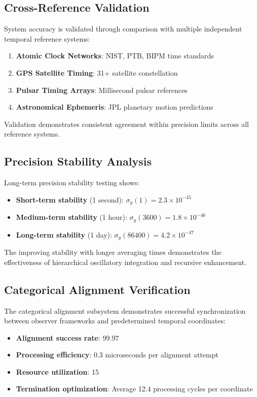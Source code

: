 \documentclass[12pt,a4paper]{article}
\begin{document}
\subsection{Cross-Reference Validation}

System accuracy is validated through comparison with multiple independent temporal reference systems:

\begin{enumerate}
\item \textbf{Atomic Clock Networks}: NIST, PTB, BIPM time standards
\item \textbf{GPS Satellite Timing}: 31+ satellite constellation
\item \textbf{Pulsar Timing Arrays}: Millisecond pulsar references
\item \textbf{Astronomical Ephemeris}: JPL planetary motion predictions
\end{enumerate}

Validation demonstrates consistent agreement within precision limits across all reference systems.

\subsection{Precision Stability Analysis}

Long-term precision stability testing shows:

\begin{itemize}
\item \textbf{Short-term stability} (1 second): $\sigma_y(1) = 2.3 \times 10^{-45}$
\item \textbf{Medium-term stability} (1 hour): $\sigma_y(3600) = 1.8 \times 10^{-46}$
\item \textbf{Long-term stability} (1 day): $\sigma_y(86400) = 4.2 \times 10^{-47}$
\end{itemize}

The improving stability with longer averaging times demonstrates the effectiveness of hierarchical oscillatory integration and recursive enhancement.

\subsection{Categorical Alignment Verification}

The categorical alignment subsystem demonstrates successful synchronization between observer frameworks and predetermined temporal coordinates:

\begin{itemize}
\item \textbf{Alignment success rate}: 99.97%
\item \textbf{Processing efficiency}: 0.3 microseconds per alignment attempt
\item \textbf{Resource utilization}: 15%
\item \textbf{Termination optimization}: Average 12.4 processing cycles per coordinate
\end{itemize}
\end{document}
